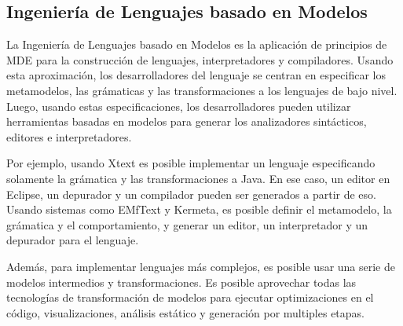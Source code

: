 \subsection{Ingeniería de Lenguajes basado en Modelos}

La Ingeniería de Lenguajes basado en Modelos es la aplicación de principios de MDE para la construcción de lenguajes, interpretadores y compiladores.
Usando esta aproximación, los desarrolladores del lenguaje se centran en especificar los metamodelos, las grámaticas y las transformaciones a los lenguajes de bajo nivel.
Luego, usando estas especificaciones, los desarrolladores pueden utilizar herramientas basadas en modelos para generar los analizadores sintácticos, editores e interpretadores.

Por ejemplo, usando Xtext es posible implementar un lenguaje especificando solamente la grámatica y las transformaciones a Java.
En ese caso, un editor en Eclipse, un depurador y un compilador pueden ser generados a partir de eso.
Usando sistemas como EMfText y Kermeta, es posible definir el metamodelo, la grámatica y el comportamiento, y generar un editor, un interpretador y un depurador para el lenguaje.

Además, para implementar lenguajes más complejos, es posible usar una serie de modelos intermedios y transformaciones.
Es posible aprovechar todas las tecnologías de transformación de modelos para ejecutar optimizaciones en el código, visualizaciones, análisis estático y generación por multiples etapas.
      